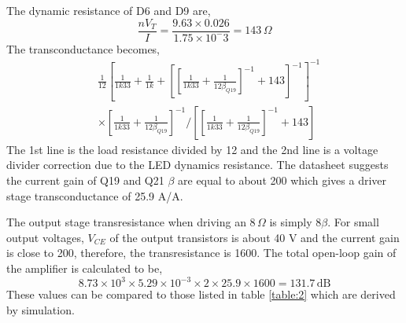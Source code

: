 \documentclass[a4paper,10pt, oneside]{article}
\begin{document}
The dynamic resistance of D6 and D9 are,
\begin{equation}
\frac{nV_{T}}{I} = \frac{9.63\times 0.026}{1.75\times 10^-3} =  143\,\Omega
\end{equation}
The transconductance becomes,
\begin{equation}
\begin{split}
&\frac{1}{12}\left[\frac{1}{1k33}  + \frac{1}{1k} + \left[\left[\frac{1}{1k33} + \frac{1}{12\beta_{Q19}}\right]^{-1}+143\right]^{-1}\right]^{-1}\\
&\times  \left[\frac{1}{1k33}+\frac{1}{12\beta_{Q19}}  \right]^{-1}/\left[\left[\frac{1}{1k33}+\frac{1}{12\beta_{Q19}}  \right]^{-1}+143\right] 
\end{split}
\end{equation}
The 1st line is the load resistance divided by 12 and the 2nd line is a voltage divider correction due to the LED dynamics resistance. The datasheet suggests the current gain of Q19 and Q21 $\beta$ are equal to about 200 which gives a driver stage transconductance of 25.9 A/A.

The output stage transresistance when driving an $8\,\Omega$ is simply $8\beta$. For small output voltages, $V_{CE}$ of the output transistors is about 40 V and the current gain is close to 200, therefore, the transresistance is 1600. The total open-loop gain of the amplifier is calculated to be,
\begin{equation}
 8.73\times 10^{3}\times 5.29\times 10^{-3}\times 2\times 25.9\times 1600 = 131.7\,\textrm{dB}
\end{equation}
These values can be compared to those listed in table \ref{table:2} which are derived by simulation. 
\end{document}
